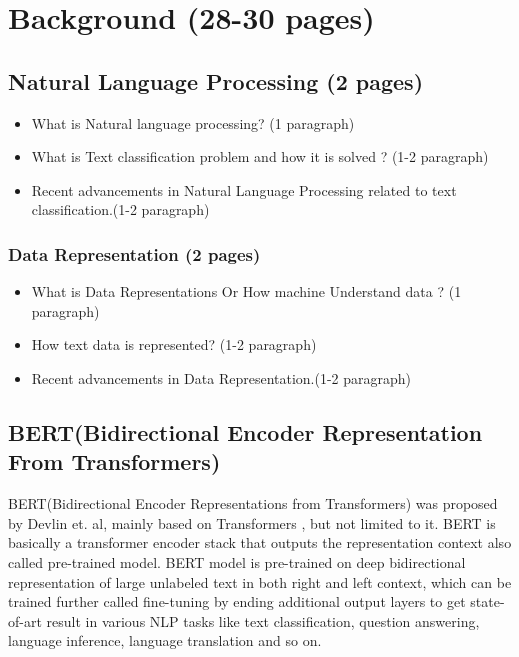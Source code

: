 \documentclass[%
	BCOR=8mm, %
	DIV=12, 
	toc=bibliography, %
	toc=listof, %
	oneside, %
	egregdoesnotlikesansseriftitles, %
	]{scrbook}
\begin{document}
\chapter{Background (28-30 pages)}
\section{Natural Language Processing (2 pages)}

\begin{itemize}
\item What is Natural language processing? (1 paragraph)
\item What is Text classification problem and how it is solved ? (1-2 paragraph)
\item Recent advancements in Natural Language Processing related to text classification.(1-2 paragraph)
\end{itemize}
\subsection{Data Representation (2 pages)}
\label{subsection:DataRep}

\begin{itemize}
\item What is Data Representations Or How machine Understand data ? (1 paragraph)
\item How text data is represented? (1-2 paragraph)
\item Recent advancements in Data Representation.(1-2 paragraph)
\end{itemize}
\section{BERT(Bidirectional Encoder Representation From Transformers)}

 BERT(Bidirectional Encoder Representations from Transformers) was proposed by Devlin et$.$ al\cite{devlin_bert_2019}, mainly based on Transformers \cite{vaswani_attention_2017},
 but not limited to it. BERT is  basically a transformer encoder stack that outputs the representation context also called pre-trained model. BERT model is pre-trained on deep bidirectional 
 representation of large unlabeled text in both right and left context, which can be trained further called fine-tuning by ending additional output layers to get state-of-art result in various 
 NLP tasks like text classification, question answering, language inference,  language translation and so on. 
 
\end{document}
